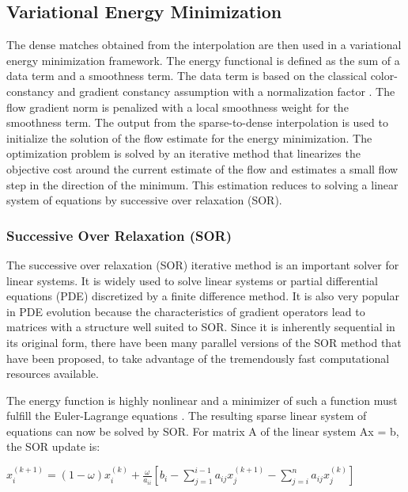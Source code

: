 \documentclass[english]{article}
\begin{document}
	\subsection{Variational Energy Minimization}
	The dense matches obtained from the interpolation are then used in a variational energy minimization framework. The energy functional is defined as the sum of a data term and a smoothness term. The data term is based on the classical color-constancy and gradient constancy assumption with a normalization factor \cite{5}. The flow gradient norm is penalized with a local smoothness weight for the smoothness term. The output from the sparse-to-dense interpolation is used to initialize the solution of the flow estimate for the energy minimization. The optimization problem is solved by an iterative method that linearizes the objective cost around the current estimate of the flow and estimates a small flow step in the direction of the minimum. This estimation reduces to solving a linear system of equations by successive over relaxation (SOR).


	\subsubsection{Successive Over Relaxation (SOR)}
	The successive over relaxation (SOR) iterative method \cite{10} is an important solver for linear systems. It is widely used to solve linear systems or partial differential equations (PDE) discretized by a finite difference method. It is also very popular in PDE evolution because the characteristics of gradient operators lead to matrices with a structure well suited to SOR. Since it is inherently sequential in its original form, there have been many parallel versions of the SOR method that have been proposed, to take advantage of the tremendously fast computational resources available.\newline 
	
	The energy function is highly nonlinear and a minimizer of such a function must fulfill the Euler-Lagrange equations \cite{13}. The resulting sparse linear system of equations can now be solved by SOR. For matrix A of the linear system Ax = b, the SOR update is:

	\begin{center}
	$x_i^{(k+1)} = (1 - \omega)x_i^{(k)} + \frac{\omega}{a_{ii}}[b_i - \displaystyle\sum_{j=1}^{i-1} a_{ij} x_j^{(k+1)} - \displaystyle\sum_{j=i}^{n} a_{ij}x_j^{(k)}]$
	\end{center}	
\end{document}
